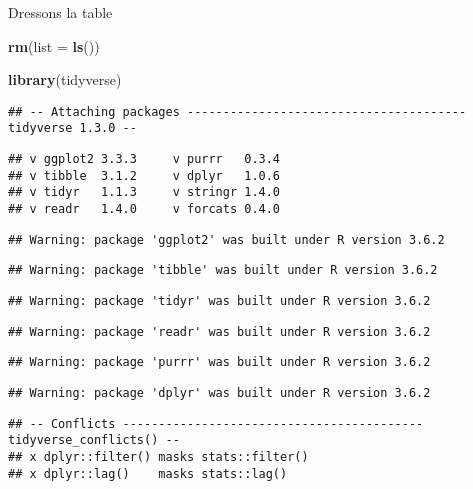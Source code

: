 \documentclass[ignorenonframetext,]{beamer}
\newenvironment{Shaded}{\begin{snugshade}}{\end{snugshade}}
\newcommand{\KeywordTok}[1]{\textcolor[rgb]{0.13,0.29,0.53}{\textbf{#1}}}
\newcommand{\DataTypeTok}[1]{\textcolor[rgb]{0.13,0.29,0.53}{#1}}
\newcommand{\NormalTok}[1]{#1}
\begin{document}
\begin{frame}[fragile]{Dressons la table}

\begin{Shaded}
\begin{Highlighting}[]
\KeywordTok{rm}\NormalTok{(}\DataTypeTok{list =} \KeywordTok{ls}\NormalTok{())}

\KeywordTok{library}\NormalTok{(tidyverse)}
\end{Highlighting}
\end{Shaded}

\begin{verbatim}
## -- Attaching packages --------------------------------------- tidyverse 1.3.0 --
\end{verbatim}

\begin{verbatim}
## v ggplot2 3.3.3     v purrr   0.3.4
## v tibble  3.1.2     v dplyr   1.0.6
## v tidyr   1.1.3     v stringr 1.4.0
## v readr   1.4.0     v forcats 0.4.0
\end{verbatim}

\begin{verbatim}
## Warning: package 'ggplot2' was built under R version 3.6.2
\end{verbatim}

\begin{verbatim}
## Warning: package 'tibble' was built under R version 3.6.2
\end{verbatim}

\begin{verbatim}
## Warning: package 'tidyr' was built under R version 3.6.2
\end{verbatim}

\begin{verbatim}
## Warning: package 'readr' was built under R version 3.6.2
\end{verbatim}

\begin{verbatim}
## Warning: package 'purrr' was built under R version 3.6.2
\end{verbatim}

\begin{verbatim}
## Warning: package 'dplyr' was built under R version 3.6.2
\end{verbatim}

\begin{verbatim}
## -- Conflicts ------------------------------------------ tidyverse_conflicts() --
## x dplyr::filter() masks stats::filter()
## x dplyr::lag()    masks stats::lag()
\end{verbatim}


\end{frame}
\end{document}

